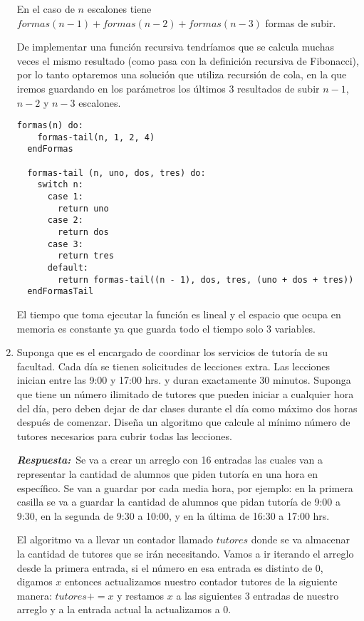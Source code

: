 \documentclass[11pt,letterpaper]{article}
\newcommand\respuesta{\textbf{\textit{Respuesta:}}}
\begin{document}
\begin{enumerate}[leftmargin=*]
    En el caso de $n$ escalones tiene $formas(n-1) + formas(n-2) + formas(n-3)$ formas de subir.

    De implementar una función recursiva tendríamos que se calcula muchas veces el mismo resultado (como pasa con la definición recursiva de Fibonacci), por lo tanto optaremos una solución que utiliza recursión de cola, en la que iremos guardando en los parámetros los últimos 3 resultados de subir $n-1$, $n-2$ y $n-3$ escalones.

    \begin{lstlisting}[caption=Recursión de cola en escalones.]
  formas(n) do:
    formas-tail(n, 1, 2, 4)
  endFormas

  formas-tail (n, uno, dos, tres) do:
    switch n:
      case 1:  
        return uno
      case 2:
        return dos
      case 3:
        return tres
      default:
        return formas-tail((n - 1), dos, tres, (uno + dos + tres))
  endFormasTail
    \end{lstlisting}

    El tiempo que toma ejecutar la función es lineal y el espacio que ocupa en memoria es constante ya que guarda todo el tiempo solo 3 variables.

    \item Suponga que es el encargado de coordinar los servicios de tutoría de su facultad. Cada día se tienen solicitudes de lecciones extra. Las lecciones inician entre las 9:00 y 17:00 hrs. y duran exactamente 30 minutos. Suponga que tiene un número ilimitado de tutores que pueden iniciar a cualquier hora del día, pero deben dejar de dar clases durante el día como máximo dos horas después de comenzar. Diseña un algoritmo que calcule al mínimo número de tutores necesarios para cubrir todas las lecciones.
    
    \respuesta\ Se va a crear un arreglo con 16 entradas las cuales van a representar la cantidad de alumnos que piden tutoría en una hora en específico. Se van a guardar por cada media hora, por ejemplo: en la primera casilla se va a guardar la cantidad de alumnos que pidan tutoría de 9:00 a 9:30, en la segunda de 9:30 a 10:00, y en la última de 16:30 a 17:00 hrs.
    
    El algoritmo va a llevar un contador llamado $tutores$ donde se va almacenar la cantidad de tutores que se irán necesitando. Vamos a ir iterando el arreglo desde la primera entrada, si el número en esa entrada es distinto de 0, digamos $x$ entonces actualizamos nuestro contador tutores de la siguiente manera: $tutores += x$ y restamos $x$ a las siguientes 3 entradas de nuestro arreglo y a la entrada actual la actualizamos a 0.


\end{enumerate}
\end{document}

